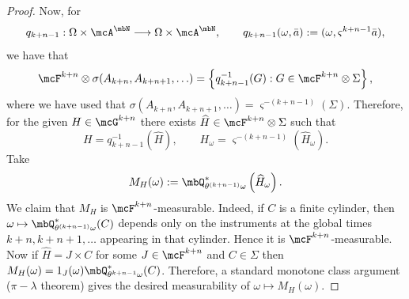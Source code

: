 \documentclass[a4paper]{article}
\numberwithin{equation}{section}   %
\theoremstyle{plain}   %
\theoremstyle{plain}   %
\theoremstyle{examplestyle}
\begin{document}
\begin{proof}
            Now, for
            \[
                q_{k+n-1}:
                \Omega\times\mcA^{\mbN}
                \longrightarrow
                \Omega\times\mcA^{\mbN},
                \qquad
                q_{k+n-1}(\omega,\bar a)
                :=
                (\omega,\varsigma^{k+n-1}\bar a),
            \]
            we have that
            \[
                \mcF^{k+n}\otimes
                \sigma(A_{k+n},A_{k+n+1},\ldots)
                =
                \left\{
                    q_{k+n-1}^{-1}(G):
                    G\in\mcF^{k+n}\otimes\Sigma
                \right\},
            \]
            where we have used that \(\sigma(A_{k+n},A_{k+n+1},\ldots) = \varsigma^{-(k+n-1)}(\Sigma)\). 
            Therefore, for the given $H\in\mcG^{k+n}$ there exists \(\widehat H\in\mcF^{k+n}\otimes\Sigma\) such that
            \begin{equation}
            \label{eq:alpha-future-pullback}
                H=q_{k+n-1}^{-1}(\widehat H),
                \qquad
                H_\omega
                =
                \varsigma^{-(k+n-1)}(\widehat H_\omega).
            \end{equation}
            Take
            \begin{equation}
            \label{eq:alpha-future-effect}
                M_H(\omega)
                :=
                \mbQ^*_{\theta^{(k+n-1)}\omega}
                \left(\widehat H_\omega\right).
            \end{equation}  
            We claim that \(M_H\) is \(\mcF^{k+n}\)-measurable. 
            Indeed, if \(C\) is a finite cylinder, then \(\omega \mapsto \mbQ^*_{\theta^{(k+n-1)}\omega}(C)\) 
            depends only on the instruments at the global times  \(k+n,k+n+1,\ldots\) appearing in that cylinder. Hence it is \(\mcF^{k+n}\)-measurable.
            Now if $\widehat H = J \times C$ for some $J\in \mcF^{k+n}$ and $C\in\Sigma$ then $M_H(\omega) = 1_J(\omega)\mbQ^*_{\theta^{k+n-1}\omega}(C)$.
            Therefore, a standard monotone class argument ($\pi-\lambda$ theorem) gives the desired measurability of $\omega\mapsto M_H(\omega)$. 
        

\end{proof}
\end{document}
